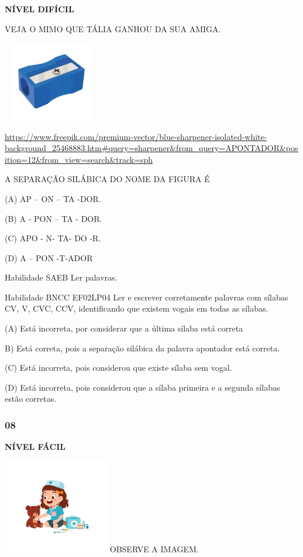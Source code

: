 \textbf{NÍVEL DIFÍCIL}

VEJA O MIMO QUE TÁLIA GANHOU DA SUA AMIGA.

\includegraphics[width=1.67273in,height=1.37251in]{media/image168.jpeg}

\url{https://www.freepik.com/premium-vector/blue-sharpener-isolated-white-background_25468883.htm\#query=sharpener\&from_query=APONTADOR\&position=12\&from_view=search\&track=sph}

A SEPARAÇÃO SILÁBICA DO NOME DA FIGURA É

(A) AP -- ON -- TA -DOR.

(B) A - PON -- TA - DOR.

(C) APO - N- TA- DO -R.

(D) A -- PON -T-ADOR

Habilidade SAEB Ler palavras.

Habilidade BNCC EF02LP04 Ler e escrever corretamente palavras com
sílabas CV, V, CVC, CCV, identificando que existem vogais em todas as
sílabas.

(A) \protect\hypertarget{_Hlk129375975}{}{}Está incorreta, por
considerar que a última sílaba está correta

B) Está correta, pois a separação silábica da palavra apontador está
correta.

(C) Está incorreta, pois considerou que existe sílaba sem vogal.

(D) Está incorreta, pois considerou que a sílaba primeira e a segunda
sílabas estão corretas.

\subsubsection{08}\label{section-134}

\textbf{NÍVEL FÁCIL}

\includegraphics[width=1.87273in,height=1.62645in]{media/image169.jpeg}OBSERVE
A IMAGEM.

